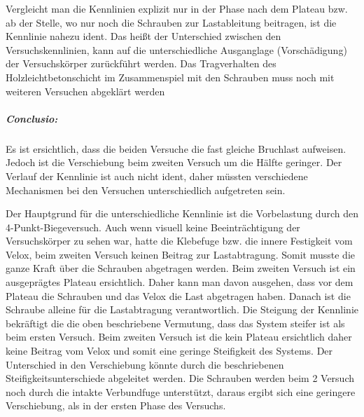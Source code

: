 \documentclass[12 pt,a4 paper ]{scrreprt}
\begin{document}
Vergleicht man die Kennlinien explizit nur in der Phase nach dem Plateau bzw. ab der Stelle, wo nur noch die Schrauben zur Lastableitung beitragen, ist die Kennlinie nahezu ident. Das heißt der Unterschied zwischen den Versuchskennlinien, kann auf die unterschiedliche Ausganglage (Vorschädigung) der Versuchskörper zurückführt werden. \newline
Das Tragverhalten des Holzleichtbetonschicht im Zusammenspiel mit den Schrauben muss noch mit weiteren Versuchen abgeklärt werden


	\subparagraph{Conclusio:}


Es ist ersichtlich, dass die beiden Versuche die fast gleiche Bruchlast aufweisen. Jedoch ist die Verschiebung beim zweiten Versuch um die Hälfte geringer. Der Verlauf der Kennlinie ist auch nicht ident, daher müssten verschiedene Mechanismen bei den  Versuchen unterschiedlich aufgetreten sein. 

Der Hauptgrund für die unterschiedliche Kennlinie ist die Vorbelastung durch den  4-Punkt-Biegeversuch. Auch wenn visuell keine Beeinträchtigung der Versuchskörper zu sehen war, hatte die Klebefuge bzw. die innere Festigkeit vom Velox, beim zweiten Versuch keinen Beitrag zur Lastabtragung. Somit musste die ganze Kraft über die Schrauben abgetragen werden.  Beim zweiten Versuch ist ein ausgeprägtes Plateau ersichtlich. Daher kann man davon ausgehen, dass vor dem Plateau die Schrauben und das Velox die Last abgetragen haben. Danach ist die Schraube alleine für die Lastabtragung verantwortlich. Die Steigung der Kennlinie bekräftigt die die oben beschriebene Vermutung, dass das System steifer ist als beim ersten Versuch. Beim zweiten Versuch ist die kein Plateau ersichtlich daher keine Beitrag vom Velox und somit eine geringe Steifigkeit des Systems.
Der Unterschied in den Verschiebung könnte durch die beschriebenen Steifigkeitsunterschiede abgeleitet werden. Die Schrauben werden beim 2 Versuch noch durch die intakte Verbundfuge 
unterstützt, daraus ergibt sich eine geringere Verschiebung, als in der ersten Phase des Versuchs.
\end{document}
